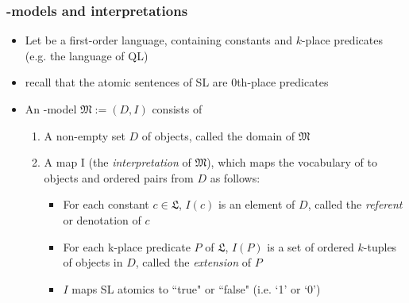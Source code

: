 \begin{frame}
\frametitle{-models and interpretations}

\begin{itemize}[<+->]

\item Let  be a first-order language, containing constants and $k$-place predicates (e.g. the language of QL)
\bi
\item recall that the atomic sentences of SL are 0th-place predicates
\ei
\item An -model $\mathfrak{M} := (D, I)$ consists of

\begin{enumerate}

\item A non-empty set $D$ of objects, called the domain of   $\mathfrak{M}$

\item A map I (the \textit{interpretation} of $\mathfrak{M}$), which maps the vocabulary of  to objects and ordered pairs from $D$ as follows:

\begin{itemize}

\small

\item For each constant $c \in \mathfrak{L}$, $I(c)$ is an element of $D$, called the \textit{referent} or denotation of $c$

\item For each k-place predicate $P$ of $\mathfrak{L}$, $I(P)$ is a set of ordered $k$-tuples of objects in $D$, called the \textit{extension} of $P$
\item $I$ maps SL atomics to ``true" or ``false" (i.e. `1' or `0')

\end{itemize}

\end{enumerate}


\end{itemize}
\end{frame}


